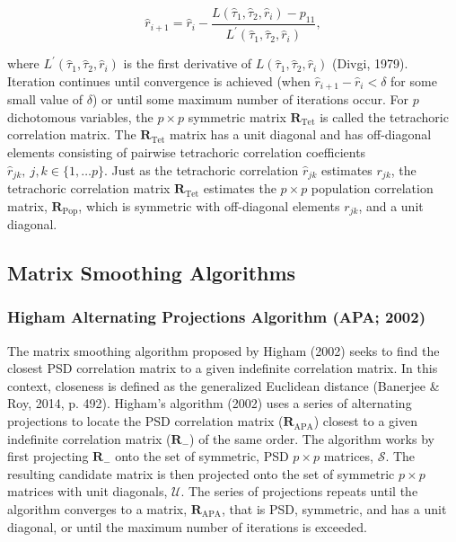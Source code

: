 \documentclass[
  english,
  man]{apa6}
\begin{document}
\begin{equation}
\hat{r}_{i + 1} = \hat{r}_i - \frac{L(\hat{\tau}_1, \hat{\tau}_2,\hat{r}_i) - p_{11}}{L^\prime(\hat{\tau}_1, \hat{\tau}_2,\hat{r}_i)},
\label{eq:tetcor-estimate}
\end{equation}

\noindent where \(L^\prime(\hat{\tau}_1, \hat{\tau}_2, \hat{r}_i)\) is the first derivative of \(L(\hat{\tau}_1, \hat{\tau}_2, \hat{r}_i)\) (Divgi, 1979). Iteration continues until convergence is achieved (when \(\hat{r}_{i+1} - \hat{r}_i < \delta\) for some small value of \(\delta\)) or until some maximum number of iterations occur. For \(p\) dichotomous variables, the \(p \times p\) symmetric matrix \(\mathbf{R}_{\textrm{Tet}}\) is called the tetrachoric correlation matrix. The \(\mathbf{R}_{\textrm{Tet}}\) matrix has a unit diagonal and has off-diagonal elements consisting of pairwise tetrachoric correlation coefficients \(\hat{r}_{jk}, \: j,k \in \{1, \dots p \}\). Just as the tetrachoric correlation \(\hat{r}_{jk}\) estimates \(r_{jk}\), the tetrachoric correlation matrix \(\mathbf{R}_{\textrm{Tet}}\) estimates the \(p \times p\) population correlation matrix, \(\mathbf{R}_{\textrm{Pop}}\), which is symmetric with off-diagonal elements \(r_{jk}\), and a unit diagonal.

\hypertarget{matrix-smoothing-algorithms}{%
\subsection{Matrix Smoothing Algorithms}\label{matrix-smoothing-algorithms}}

\hypertarget{higham-alternating-projections-algorithm-apa-2002}{%
\subsubsection{Higham Alternating Projections Algorithm (APA; 2002)}\label{higham-alternating-projections-algorithm-apa-2002}}

The matrix smoothing algorithm proposed by Higham (2002) seeks to find the closest PSD correlation matrix to a given indefinite correlation matrix. In this context, closeness is defined as the generalized Euclidean distance (Banerjee \& Roy, 2014, p. 492). Higham's algorithm (2002) uses a series of alternating projections to locate the PSD correlation matrix (\(\mathbf{R}_{\textrm{APA}}\)) closest to a given indefinite correlation matrix (\(\mathbf{R}_{-}\)) of the same order. The algorithm works by first projecting \(\mathbf{R}_{-}\) onto the set of symmetric, PSD \(p \times p\) matrices, \(\mathcal{S}\). The resulting candidate matrix is then projected onto the set of symmetric \(p \times p\) matrices with unit diagonals, \(\mathcal{U}\). The series of projections repeats until the algorithm converges to a matrix, \(\mathbf{R}_{\textrm{APA}}\), that is PSD, symmetric, and has a unit diagonal, or until the maximum number of iterations is exceeded.
\end{document}

